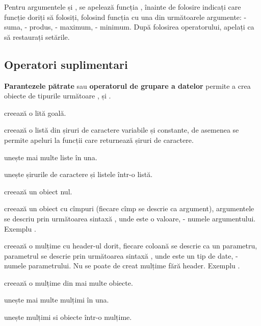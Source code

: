 Pentru argumentele \integer{} și \double{}, se apelează funcția , înainte de folosire indicați care funcție doriți să folosiți, folosind funcția  cu una din următoarele argumente:  - suma,  - produs,  - maximum,  - minimum. După folosirea operatorului, apelați  ca să restaurați setările.

\subsection{Operatori suplimentari}

{\bf Parantezele pătrate} sau {\bf operatorul de grupare a datelor} permite a crea obiecte de tipurile următoare \listtype{}, \set{} și \object{}.

 creează o lită goală.

 creează o listă din șiruri de caractere variabile și constante, de asemenea se permite apeluri la funcții care returnează șiruri de caractere.

 unește mai multe liste în una.

 unește șirurile de caractere și listele într-o listă.

 creează un obiect nul.

 creează un obiect cu cîmpuri (fiecare cîmp se descrie ca argument), argumentele se descriu prin următoarea sintaxă , unde  este o valoare,  - numele argumentului. Exemplu .

 creează o mulțime cu header-ul dorit, fiecare coloană se descrie ca un parametru, parametrul se descrie prin următoarea sintaxă , unde  este un tip de date,  - numele parametrului. Nu se poate de creat mulțime fără header. Exemplu .

 creează o mulțime din mai multe obiecte.

 unește mai multe mulțimi în una.

 unește mulțimi si obiecte într-o mulțime.

